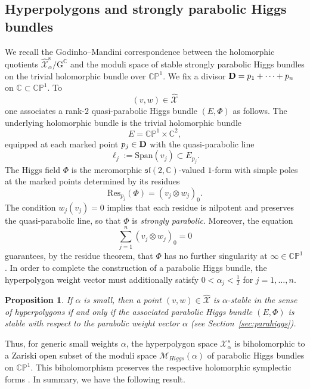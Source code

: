 \documentclass[12pt,a4paper]{amsart}
\newtheorem{proposition}[theorem]{Proposition}
\theoremstyle{definition}
\theoremstyle{remark}
\newcommand{\C}{\mathbb C}
\newcommand{\CP}{\mathbb{CP}}
\newcommand{\Res}{\mathrm{Res}}
\newcommand{\Mcal}{\mathcal M}
\begin{document}
\subsection{Hyperpolygons and strongly parabolic Higgs bundles}
We recall the Godinho--Mandini correspondence \cite{GoMa} between the holomorphic quotients
$\hat{\mathcal X}_\alpha^{\mathrm{s}}/\mathrm{G}^\C$ and the moduli space of stable strongly parabolic
Higgs bundles on the trivial holomorphic bundle over $\CP^1$.
We fix  a divisor ${\bf D}= p_1+\dots+p_n$ on $\C\subset\CP^1$. To 
\[
(v,w)\in\hat{\mathcal X}
\]
one associates a rank-$2$ quasi-parabolic Higgs bundle $(E,\Phi)$ as follows.
The underlying holomorphic bundle is the trivial holomorphic  bundle
\[
E=\CP^1\times\C^2,
\]
equipped at each marked point $p_j\in{\bf D}$ with the quasi-parabolic line
\[
\ell_j:=\mathrm{Span}(v_j)\subset E_{p_j}.
\]
The Higgs field $\Phi$ is the meromorphic $\mathfrak{sl}(2,\C)$-valued $1$-form with
simple poles at the marked points determined by its residues
\[
\Res_{p_j}(\Phi)=(v_j\otimes w_j)_0.
\]
The condition $w_j(v_j)=0$ implies that each residue is nilpotent and preserves the
quasi-parabolic line, so that $\Phi$ is \emph{strongly parabolic}.
Moreover, the equation
\[
\sum_{j=1}^n (v_j\otimes w_j)_0=0
\]
guarantees, by the residue theorem, that $\Phi$ has no further singularity at $\infty\in\CP^1$. 
In order to complete the construction of a parabolic Higgs bundle, the hyperpolygon weight vector 
must additionally satisfy $0 < \alpha_j <\frac{1}{2}$ for $j=1,\dots,n$. 

\begin{proposition}\label{pro:Goma}
{\cite{GoMa}}
If $\alpha$ is small, then a point $(v,w)\in\hat{\mathcal X}$ is $\alpha$-stable in the sense of hyperpolygons if and only if the associated
parabolic Higgs bundle $(E,\Phi)$ is stable with respect to the parabolic weight vector $\alpha$ (see Section~\ref{sec:parahiggs}).
\end{proposition}

Thus, for generic small weights $\alpha$, the hyperpolygon space
$\mathcal X_\alpha^s$ is biholomorphic to a Zariski open subset of the moduli space $\Mcal_{Higgs}(\alpha)$ of  parabolic 
Higgs bundles on $\CP^1$. This biholomorphism preserves the respective 
holomorphic symplectic forms \cite{BiFloGoMa}.
In summary, we have the following result.
\end{document}
